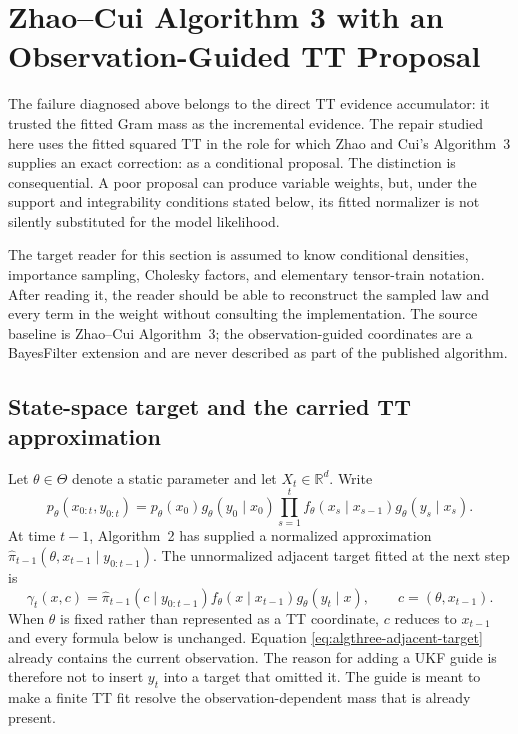 \documentclass[11pt]{article}
\begin{document}
\section{Zhao--Cui Algorithm 3 with an Observation-Guided TT Proposal}
\label{sec:algthree-active}

The failure diagnosed above belongs to the direct TT evidence accumulator: it
trusted the fitted Gram mass as the incremental evidence.  The repair studied
here uses the fitted squared TT in the role for which Zhao and Cui's
Algorithm~3 supplies an exact correction: as a conditional proposal.  The
distinction is consequential.  A poor proposal can produce variable weights,
but, under the support and integrability conditions stated below, its fitted
normalizer is not silently substituted for the model likelihood.

The target reader for this section is assumed to know conditional densities,
importance sampling, Cholesky factors, and elementary tensor-train notation.
After reading it, the reader should be able to reconstruct the sampled law and
every term in the weight without consulting the implementation.  The source
baseline is Zhao--Cui Algorithm~3; the observation-guided coordinates are a
BayesFilter extension and are never described as part of the published
algorithm.

\subsection{State-space target and the carried TT approximation}

Let $\theta\in\Theta$ denote a static parameter and let
$X_t\in\mathbb R^d$.  Write
\begin{equation}
 p_\theta(x_{0:t},y_{0:t})
 =p_\theta(x_0)g_\theta(y_0\mid x_0)
  \prod_{s=1}^{t}
  f_\theta(x_s\mid x_{s-1})g_\theta(y_s\mid x_s).
 \label{eq:algthree-model}
\end{equation}
At time $t-1$, Algorithm~2 has supplied a normalized approximation
$\widehat\pi_{t-1}(\theta,x_{t-1}\mid y_{0:t-1})$.  The unnormalized adjacent
target fitted at the next step is
\begin{equation}
 \gamma_t(x,c)
 =\widehat\pi_{t-1}(c\mid y_{0:t-1})
   f_\theta(x\mid x_{t-1})g_\theta(y_t\mid x),
 \qquad c=(\theta,x_{t-1}).
 \label{eq:algthree-adjacent-target}
\end{equation}
When $\theta$ is fixed rather than represented as a TT coordinate, $c$ reduces
to $x_{t-1}$ and every formula below is unchanged.  Equation
\eqref{eq:algthree-adjacent-target} already contains the current observation.
The reason for adding a UKF guide is therefore not to insert $y_t$ into a
target that omitted it.  The guide is meant to make a finite TT fit resolve
the observation-dependent mass that is already present.
\end{document}
